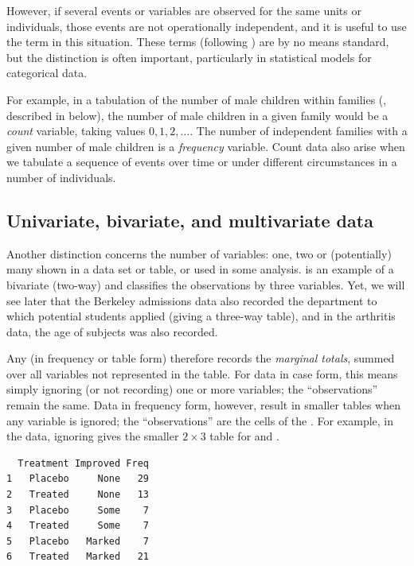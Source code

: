 \documentclass[10pt,krantz2]{krantz}\usepackage[]{graphicx}\usepackage[]{color}
\makeatletter
\newenvironment{kframe}{%
 \def\at@end@of@kframe{}%
 \ifinner\ifhmode%
  \def\at@end@of@kframe{\end{minipage}}%
  \begin{minipage}{\columnwidth}%
 \fi\fi%
 \def\FrameCommand##1{\hskip\@totalleftmargin \hskip-\fboxsep
 \colorbox{shadecolor}{##1}\hskip-\fboxsep
     \hskip-\linewidth \hskip-\@totalleftmargin \hskip\columnwidth}%
 \MakeFramed {\advance\hsize-\width
   \@totalleftmargin\z@ \linewidth\hsize
   \@setminipage}}%
 {\par\unskip\endMakeFramed%
 \at@end@of@kframe}
\newenvironment{knitrout}{}{} %
\renewenvironment{knitrout}{\small\renewcommand{\baselinestretch}{.85}}{} %
\makeatother
\begin{document}
However, if several events or variables are observed for the same units or individuals, those events are not
operationally independent, and it is useful to use the term
 in this situation.  These terms (following
\citet{Lindsey:95}) are by no means standard, but
the distinction is often important, particularly in statistical
models for categorical data.

For example, in a tabulation of the number of male
children within families (, described in
 below),
the number of male children in a given family would be a \emph{count} variable,
taking values $0, 1, 2, \dots$.  The number of independent families with
a given number of male children is a \emph{frequency} variable.
Count data also arise when we tabulate a sequence of events over time
or under different circumstances in a number of individuals.



\subsection{Univariate, bivariate, and multivariate data}\label{sec:uni-multi}
Another distinction concerns the number of variables: one, two or
(potentially) many shown in a data set or table, or used in some
analysis.
 is an example of a bivariate (two-way) \ctab
and  classifies the observations by three variables.
Yet, we will see later
that the Berkeley admissions data also recorded
the department to which potential students applied (giving a three-way
table), and in the arthritis data, the age of subjects was also
recorded.

Any \ctab (in frequency or table form) therefore records the \emph{marginal totals}, summed over all
variables not represented in the table.
For data in case form, this means simply ignoring (or not recording)
one or more variables;  the ``observations'' remain the same.
Data in frequency form, however, result in smaller tables when
any variable is ignored;  the ``observations'' are the cells of
the \ctab. For example, in the  data, ignoring 
gives the smaller $2 \times 3$ table for  and .
\begin{knitrout}
\color{fgcolor}\begin{kframe}
\begin{verbatim}
  Treatment Improved Freq
1   Placebo     None   29
2   Treated     None   13
3   Placebo     Some    7
4   Treated     Some    7
5   Placebo   Marked    7
6   Treated   Marked   21
\end{verbatim}
\end{kframe}
\end{knitrout}
\end{document}
